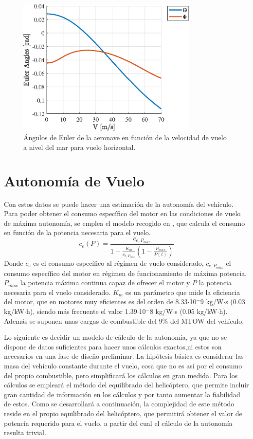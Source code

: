 \begin{figure}
	\centering
	\includegraphics[width=90mm]{graficos/EulerVH}
	\caption{Ángulos de Euler de la aeronave en función de la velocidad de vuelo a nivel del mar para vuelo horizontal.}
	\label{EulerVH}
\end{figure}

\section{Autonomía de Vuelo}

Con estos datos se puede hacer una estimación de la autonomía del vehículo. 
Para poder obtener el consumo específico del motor en las condiciones de vuelo de máxima autonomía, se emplea el modelo recogido en \citet{Cuerva}, que calcula el consumo en función de la potencia necesaria para el vuelo.
\begin{equation}
	c_e(P)=\frac{c_{e,P_{max}}}{1+\frac{K_m}{c_{e,P_{max}}}(1-\frac{P_{max}}{P(t)})}
	\label{consumo}
\end{equation}
Donde $c_e$ es el consumo específico al régimen de vuelo considerado, $c_{e,P_{max}}$ el consumo específico del motor en régimen de funcionamiento de máxima potencia, $P_{max}$ la potencia máxima continua capaz de ofrecer el motor y $P$ la potencia necesaria para el vuelo considerado.
$K_m$ es un parámetro que mide la eficiencia del motor, que en motores muy eficientes es del orden de 8.33$\cdot$10$^-9$ kg/W$\cdot$s (0.03 kg/kW$\cdot$h), siendo más frecuente el valor 1.39$\cdot$10$^-8$ kg/W$\cdot$s (0.05 kg/kW$\cdot$h).
Además se suponen unas cargas de combustible del 9\% del MTOW del vehículo. 

Lo siguiente es decidir un modelo de cálculo de la autonomía, ya que no se dispone de datos suficientes para hacer unos cálculos exactos,ni estos son necesarios en una fase de diseño preliminar. La hipótesis básica es considerar las masa del vehículo constante durante el vuelo, cosa que no es así por el consumo del propio combustible, pero simplificará los cálculos en gran medida.
Para los cálculos se empleará el método del equilibrado del helicóptero, que permite incluir gran cantidad de información en los cálculos y por tanto aumentar la fiabilidad de estos. Como se desarrollará a continuación, la complejidad de este método reside en el propio equilibrado del helicóptero, que permitirá obtener el valor de potencia requerido para el vuelo, a partir del cual el cálculo de la autonomía resulta trivial.

